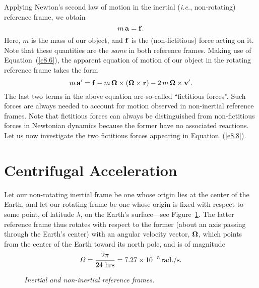 Applying Newton's second law of motion in the inertial ({\em i.e.}, non-rotating) reference frame, we obtain
\begin{equation}
m\,{\bf a} = {\bf f}.
\end{equation}
Here, $m$ is the mass of our object, and ${\bf f}$ is the (non-fictitious) force acting on it. Note that these quantities are the {\em same}\/ in both reference
frames.
Making use of Equation~(\ref{e8.6}), the  apparent equation of motion of our object in the
rotating reference frame takes the form
\begin{equation}\label{e8.8}
m\,{\bf a}' = {\bf f} - m\,\mbox{\boldmath$\Omega$}\times(\mbox{\boldmath$\Omega$}\times{\bf r}) -2\,m\,\mbox{\boldmath$\Omega$}\times{\bf v}'.
\end{equation}
The last two terms in the above equation are so-called ``fictitious forces''. Such forces
are always needed to account for motion observed in non-inertial reference
frames. Note that fictitious forces can always be distinguished from
non-fictitious forces in Newtonian dynamics because the former
have no associated reactions. 
 Let us now investigate the two fictitious forces appearing in Equation~(\ref{e8.8}).

\section{Centrifugal Acceleration}
Let our non-rotating inertial frame be one whose origin lies at the center
of the Earth, and let our rotating frame be one whose origin is fixed with respect
to some point,  of latitude $\lambda$, on the Earth's surface---see Figure~\ref{rot}.
The latter reference frame thus rotates with respect to the former (about an
axis passing through the Earth's center)
with an angular velocity vector, $\mbox{\boldmath$\Omega$}$, which points from  the center of the Earth toward its north pole, and is of magnitude
\begin{equation}
{\mit\Omega} = \frac{2\pi}{24\,\,{\rm hrs}}=7.27\times 10^{-5}\,{\rm rad./s}.
\end{equation}

\begin{figure}
\epsfysize=2.5in
\centerline{}
\caption{\em Inertial and non-inertial reference frames.}\label{rot}
\end{figure}

